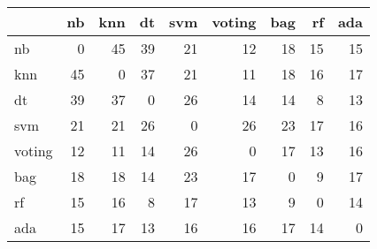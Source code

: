 \begin{tabular}{lrrrrrrrr}
\toprule
{} &  nb &  knn &  dt &  svm &  voting &  bag &  rf &  ada \\
\midrule
nb     &   0 &   45 &  39 &   21 &      12 &   18 &  15 &   15 \\
knn    &  45 &    0 &  37 &   21 &      11 &   18 &  16 &   17 \\
dt     &  39 &   37 &   0 &   26 &      14 &   14 &   8 &   13 \\
svm    &  21 &   21 &  26 &    0 &      26 &   23 &  17 &   16 \\
voting &  12 &   11 &  14 &   26 &       0 &   17 &  13 &   16 \\
bag    &  18 &   18 &  14 &   23 &      17 &    0 &   9 &   17 \\
rf     &  15 &   16 &   8 &   17 &      13 &    9 &   0 &   14 \\
ada    &  15 &   17 &  13 &   16 &      16 &   17 &  14 &    0 \\
\bottomrule
\end{tabular}

